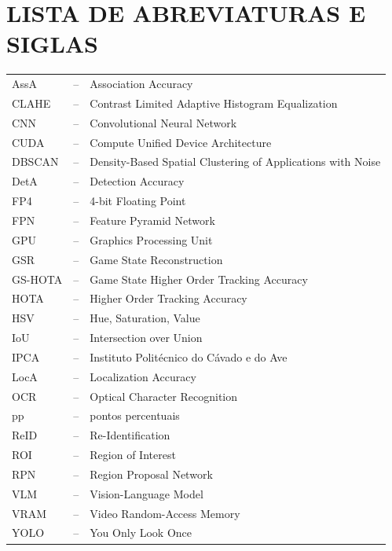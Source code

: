 \chapter{LISTA DE ABREVIATURAS E SIGLAS}

\vspace{1cm}

{
\setlength\arrayrulewidth{0pt}
\begin{tabular}{|l|l|l|}
\hline
AssA    & -- & Association Accuracy \\
CLAHE   & -- & Contrast Limited Adaptive Histogram Equalization \\
CNN     & -- & Convolutional Neural Network \\
CUDA    & -- & Compute Unified Device Architecture \\
DBSCAN  & -- & Density-Based Spatial Clustering of Applications with Noise \\
DetA    & -- & Detection Accuracy \\
FP4     & -- & 4-bit Floating Point \\
FPN     & -- & Feature Pyramid Network \\
GPU     & -- & Graphics Processing Unit \\
GSR     & -- & Game State Reconstruction \\
GS-HOTA & -- & Game State Higher Order Tracking Accuracy \\
HOTA    & -- & Higher Order Tracking Accuracy \\
HSV     & -- & Hue, Saturation, Value \\
IoU     & -- & Intersection over Union \\
IPCA    & -- & Instituto Politécnico do Cávado e do Ave \\
LocA    & -- & Localization Accuracy \\
OCR     & -- & Optical Character Recognition \\
pp      & -- & pontos percentuais \\
ReID    & -- & Re-Identification \\
ROI     & -- & Region of Interest \\
RPN     & -- & Region Proposal Network \\
VLM     & -- & Vision-Language Model \\
VRAM    & -- & Video Random-Access Memory \\
YOLO    & -- & You Only Look Once \\
\hline
\end{tabular}
}
